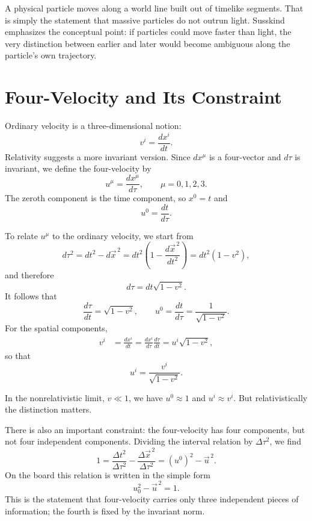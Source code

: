 A physical particle moves along a world line built out of timelike segments. That is simply the statement that massive particles do not outrun light. Susskind emphasizes the conceptual point: if particles could move faster than light, the very distinction between earlier and later would become ambiguous along the particle's own trajectory.

\section{Four-Velocity and Its Constraint}

Ordinary velocity is a three-dimensional notion:
\begin{equation}
v^i=\frac{dx^i}{dt}.
\end{equation}
Relativity suggests a more invariant version. Since \(dx^\mu\) is a four-vector and \(d\tau\) is invariant, we define the four-velocity by
\begin{equation}
u^\mu=\frac{dx^\mu}{d\tau},
\qquad
\mu=0,1,2,3.
\end{equation}
The zeroth component is the time component, so \(x^0=t\) and
\begin{equation}
u^0=\frac{dt}{d\tau}.
\end{equation}

To relate \(u^\mu\) to the ordinary velocity, we start from
\begin{equation}
d\tau^2=dt^2-d\vec x^{\,2}
=
dt^2\left(1-\frac{d\vec x^{\,2}}{dt^2}\right)
=
dt^2(1-v^2),
\end{equation}
and therefore
\begin{equation}
d\tau=dt\sqrt{1-v^2}.
\end{equation}
It follows that
\begin{equation}
\frac{d\tau}{dt}=\sqrt{1-v^2},
\qquad
u^0=\frac{dt}{d\tau}=\frac{1}{\sqrt{1-v^2}}.
\end{equation}
For the spatial components,
\begin{align}
v^i
&=
\frac{dx^i}{dt}
=
\frac{dx^i}{d\tau}\frac{d\tau}{dt}
=
u^i\sqrt{1-v^2},
\end{align}
so that
\begin{equation}
u^i=\frac{v^i}{\sqrt{1-v^2}}.
\end{equation}

In the nonrelativistic limit, \(v\ll 1\), we have \(u^0\approx 1\) and \(u^i\approx v^i\). But relativistically the distinction matters.

There is also an important constraint: the four-velocity has four components, but not four independent components. Dividing the interval relation by \(\Delta\tau^2\), we find
\begin{equation}
1
=
\frac{\Delta t^2}{\Delta\tau^2}
-
\frac{\Delta\vec x^{\,2}}{\Delta\tau^2}
=
(u^0)^2-\vec u^{\,2}.
\end{equation}
On the board this relation is written in the simple form
\begin{equation}
u_0^2-\vec u^{\,2}=1.
\end{equation}
This is the statement that four-velocity carries only three independent pieces of information; the fourth is fixed by the invariant norm.

